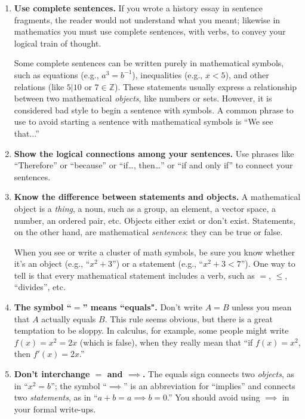 \begin{enumerate}
\item \textbf{Use complete sentences.}
        If you wrote a history essay in sentence fragments,
        the reader would not understand what you meant;
        likewise in mathematics you must use complete sentences, with verbs,
        to convey your logical train of thought.
        
        Some complete sentences can be written purely in mathematical symbols, 
        such as 
          equations (e.g., $a^3=b^{-1}$),
          inequalities (e.g., $x<5$),
          and other relations (like $5\big|10$ or $7\in\mathbb{Z}$).
        These statements usually express a relationship between two mathematical \emph{objects},
        like numbers or sets.  However, it is considered bad style to begin a sentence with symbols.  A common phrase to use to avoid starting a sentence with mathematical symbols is ``We see that...''

\item \textbf{Show the logical connections among your sentences.}
        Use phrases like ``Therefore'' or ``because'' or ``if\ldots, then\ldots''
        or ``if and only if'' to connect your sentences.
  
\item \textbf{Know the difference between statements and objects.}
        A mathematical object is a \emph{thing}, a noun,
        such as a group, an element, a vector space, a number, an ordered pair, etc.
        Objects either exist or don't exist.
        Statements, on the other hand, are mathematical \emph{sentences}:  they can be true or false.
        
        When you see or write a cluster of math symbols, be sure you know 
        whether it's an object (e.g., ``$x^2+3$'') or a statement (e.g., ``$x^2+3<7$'').
        One way to tell is that every mathematical statement includes a verb, such as
        $=$, $\leq$, ``divides'', etc.
        
\item \textbf{The symbol ``$=$'' means ``equals".}
        Don't write $A=B$ unless you mean that $A$ actually equals $B$.
        This rule seems obvious,
        but there is a great temptation to be sloppy.  In calculus, for example, some people might write $f(x)=x^{2}=2x$ (which is false), when they really mean that ``if $f(x)=x^{2}$, then $f'(x)=2x$.''

\item \textbf{Don't interchange ${=}$ and ${\implies}$.}
        The equals sign connects two \emph{objects}, as in ``$x^2=b$''; 
        the symbol ``$\implies$'' is an abbreviation for ``implies'' and connects two \emph{statements},
        as in ``$a+b=a \implies b=0$.''  You should avoid using $\implies$ in your formal write-ups.


\end{enumerate}
